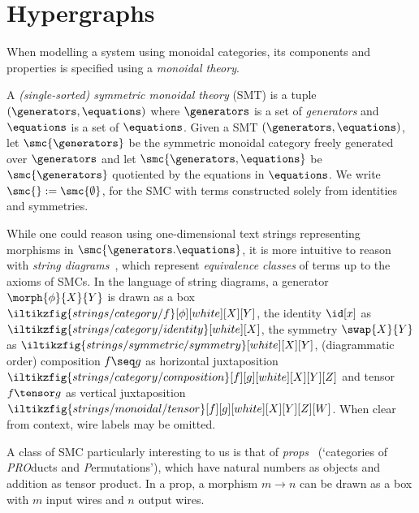 \section{Hypergraphs}

When modelling a system using monoidal categories, its components and
properties is specified using a \emph{monoidal theory}.

\begin{definition}
    A \emph{(single-sorted) symmetric monoidal theory} (SMT) is a tuple \(
        (\generators,\equations)
    \) where \(\generators\) is a set of \emph{generators} and \(\equations\)
    is a set of \(\equations\).
    Given a SMT \((\generators,\equations)\), let \(
        \smc{\generators}
    \) be the symmetric monoidal category freely generated over \(\generators\)
    and let \(
        \smc{\generators,\equations}
    \) be \(\smc{\generators}\) quotiented by the equations in \(\equations\).
    We write \(\smc{} := \smc{\emptyset}\), for the SMC with terms
    constructed solely from identities and symmetries.
\end{definition}

While one could reason using one-dimensional text strings representing morphisms
in \(\smc{\generators.\equations}\), it is more intuitive to reason with
\emph{string diagrams}~\cite{joyal1991geometry,selinger2011survey}, which
represent \emph{equivalence classes} of terms up to the axioms of SMCs.
In the language of string diagrams, a generator \(\morph{\phi}{X}{Y}\) is drawn
as a box \(
    \iltikzfig{strings/category/f}[\phi][white][X][Y]
\), the identity \(\id[x]\) as \(
    \iltikzfig{strings/category/identity}[white][X]
\), the symmetry \(\swap{X}{Y}\) as \(
    \iltikzfig{strings/symmetric/symmetry}[white][X][Y]
\), (diagrammatic order) composition \(f \seq g\) as horizontal juxtaposition \(
    \iltikzfig{strings/category/composition}[f][g][white][X][Y][Z]
\) and tensor \(f \tensor g\) as vertical juxtaposition \(
    \iltikzfig{strings/monoidal/tensor}[f][g][white][X][Y][Z][W]
\).
When clear from context, wire labels may be omitted.

A class of SMC particularly interesting to us is that of
\emph{props}~\cite{maclane1965categorical} (`categories of \emph{PRO}ducts and
\emph{P}ermutations'), which have natural numbers as objects and addition as
tensor product.
In a prop, a morphism \(m \to n\) can be drawn as a box with \(m\) input wires
and \(n\) output wires.

